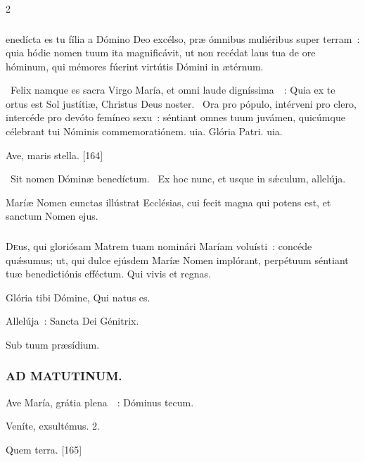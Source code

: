 \documentclass[9pt,twoside]{extarticle}
\begin{document}
\begin{multicols}{2}
{\subsubsection*{}
enedícta es tu fília a Dómino Deo excélso, præ ómnibus muliéribus super terram~: quia hódie nomen tuum ita magnificávit, ut non recédat laus tua de ore hóminum, qui mémores fúerint virtútis Dómini in ætérnum.

\begin{tightlist}{}
\item {}~Felix namque es sacra Virgo María, et omni laude digníssima~~: \textred{*} Quia ex te ortus est Sol justítiæ, Christus Deus noster.
~Ora pro pópulo, intérveni pro clero, intercéde pro devóto femíneo sexu~: séntiant omnes tuum juvámen, quicúmque célebrant tui Nóminis commemoratiónem. uia. Glória Patri. uia.
\item {} Ave, maris stella. [164]
\item {}~Sit nomen Dóminæ benedíctum. ~Ex hoc nunc, et usque in sǽculum, allelúja.
\item {} Maríæ Nomen cunctas illústrat Ecclésias, cui fecit magna qui potens est, et sanctum Nomen ejus.
\end{tightlist}

\subsubsection*{\center {}}
\lettrine{D}eus, qui gloriósam Matrem tuam nominári Maríam voluísti~: concéde quǽsumus; ut, qui dulce ejúsdem Maríæ Nomen implórant, perpétuum séntiant tuæ benedictiónis efféctum. Qui vivis et regnas.

\begin{tightlist}{}
\item {} Glória tibi Dómine, Qui natus es.
\item {} Allelúja~: Sancta Dei Génitrix.
\item {} Sub tuum præsídium.
\end{tightlist}

\subsubsection*{\center \textsc{AD MATUTINUM.}}
\begin{tightlist}{}
\item {} Ave María, grátia plena~~: \textred{*} Dóminus tecum.
\item {} Veníte, exsultémus. 2.
\item {} Quem terra. [165]
\end{tightlist}

}
\end{multicols}
\end{document}
